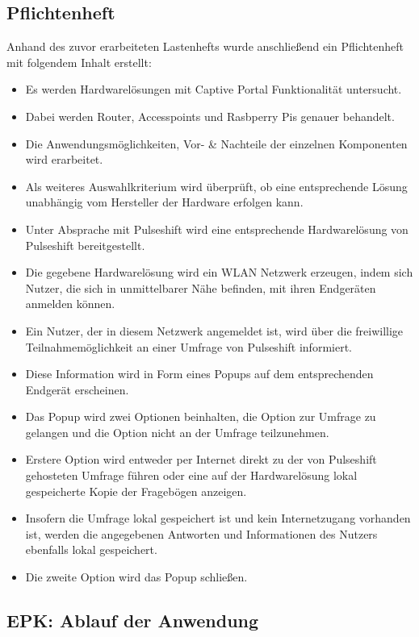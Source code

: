 \subsection{Pflichtenheft}
Anhand des zuvor erarbeiteten Lastenhefts wurde anschließend ein Pflichtenheft mit folgendem Inhalt erstellt:
\begin{itemize}
\item Es werden Hardwarelösungen mit Captive Portal Funktionalität untersucht.
\item Dabei werden Router, Accesspoints und Rasbperry Pis genauer behandelt.
\item Die Anwendungsmöglichkeiten, Vor- \& Nachteile der einzelnen Komponenten wird erarbeitet.
\item Als weiteres Auswahlkriterium wird überprüft, ob eine entsprechende Lösung unabhängig vom Hersteller der Hardware erfolgen kann.
\item Unter Absprache mit Pulseshift wird eine entsprechende Hardwarelösung von Pulseshift bereitgestellt.
\item Die gegebene Hardwarelösung wird ein WLAN Netzwerk erzeugen, indem sich Nutzer, die sich in unmittelbarer Nähe befinden, mit ihren Endgeräten anmelden können.
\item Ein Nutzer, der in diesem Netzwerk angemeldet ist, wird über die freiwillige Teilnahmemöglichkeit an einer Umfrage von Pulseshift informiert.
\item Diese Information wird in Form eines Popups auf dem entsprechenden Endgerät erscheinen.
\item Das Popup wird zwei Optionen beinhalten, die Option zur Umfrage zu gelangen und die Option nicht an der Umfrage teilzunehmen.
\item Erstere Option wird entweder per Internet direkt zu der von Pulseshift gehosteten Umfrage führen oder eine auf der Hardwarelösung lokal gespeicherte Kopie der Fragebögen anzeigen.
\item Insofern die Umfrage lokal gespeichert ist und kein Internetzugang vorhanden ist, werden die angegebenen Antworten und Informationen des Nutzers ebenfalls lokal gespeichert.
\item Die zweite Option wird das Popup schließen.
\end{itemize}



\subsection{EPK: Ablauf der Anwendung}

